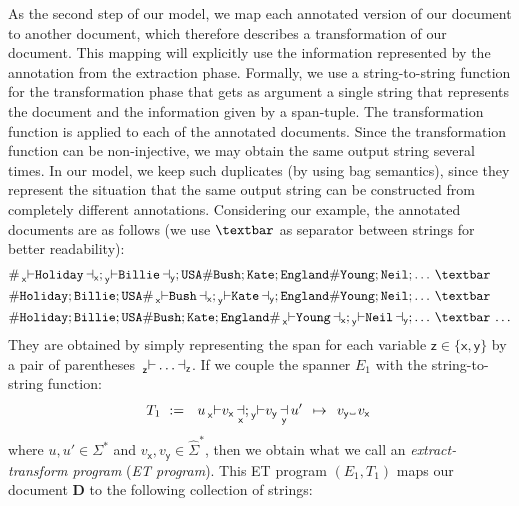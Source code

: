 \documentclass[
a4paper
]{article}
\theoremstyle{plain}
\theoremstyle{definition}
\theoremstyle{remark}
\newcommand{\firstExampleEx}{E_1}
\newcommand{\firstExampleTrans}{T_1}
\newcommand\Vtextvisiblespace[1][.3em]{%
	\mbox{\kern.06em\vrule height.3ex}%
	\vbox{\hrule width#1}%
	\hbox{\vrule height.3ex}}
\DeclareMathOperator{\openmark}{\vdash}
\DeclareMathOperator{\closemark}{\dashv}
\newcommand{\doc}{\ensuremath{\mathbf{D}}}
\newcommand{\open}[1]{\prescript{}{#1}{\openmark}}
\newcommand{\close}[1]{\closemark_{#1}}
\newcommand{\varsx}{\ensuremath{\textsf{x}}}
\newcommand{\varsy}{\ensuremath{\textsf{y}}}
\newcommand{\varsz}{\ensuremath{\textsf{z}}}
\newcommand*{\set}[1]{\ensuremath{\{ #1 \}}}
\begin{document}
As the second step of our model, we map each annotated version of our document to another document, which therefore describes a transformation of our document. This mapping will explicitly use the information represented by the annotation from the extraction phase. Formally, we use a string-to-string function for the transformation phase that gets as argument a single string that represents the document and the information given by a span-tuple.
The transformation function is applied to each of the annotated documents. Since the transformation function can be non-injective, we may obtain the same output string several times. In our model, we keep such duplicates (by using bag semantics), since they represent the situation that the same output string can be constructed from completely different annotations.
Considering our example, the annotated documents are as follows
(we use $\textbar$ as separator between strings for better readability):
\begin{align*}
&\scalebox{1}{$\# \open{\varsx}\texttt{Holiday}\close{\varsx}; \open{\varsy}\texttt{Billie}\close{\varsy}; \texttt{USA} \# \texttt{Bush}; \texttt{Kate};  \texttt{England} \# \texttt{Young}; \texttt{Neil}; \ldots \hspace{2pt}\textbar$}\\
&\scalebox{1}{$\# \texttt{Holiday}; \texttt{Billie}; \texttt{USA} \# \open{\varsx}\texttt{Bush}\close{\varsx}; \open{\varsy}\texttt{Kate}\close{\varsy}; \texttt{England} \# \texttt{Young}; \texttt{Neil}; \ldots \hspace{2pt}\textbar$}\\
&\scalebox{1}{$\# \texttt{Holiday}; \texttt{Billie}; \texttt{USA} \# \texttt{Bush}; \texttt{Kate}; \texttt{England} \# \open{\varsx} \texttt{Young} \close{\varsx}; \open{\varsy} \texttt{Neil} \close{\varsy}; \ldots \hspace{2pt}\textbar \hspace{2pt} \ldots$}
\end{align*}
They are obtained by simply representing the span for 
each variable $\varsz\in\set{\varsx,\varsy}$ by a pair of parentheses~$\open{\varsz} \ldots \close{\varsz}$.
If we couple the spanner $\firstExampleEx$ with the string-to-string function:\label{T1Function}
\[
\firstExampleTrans \ := \ \ u \open{\varsx} v_{\varsx} \close{\varsx}; \open{\varsy} v_{\varsy} \close{\varsy} u' \:\: \mapsto \:\: v_{\varsy} \Vtextvisiblespace \, v_{\varsx}\,
\]
where $u, u' \in \Sigma^*$ and $v_{\varsx}, v_{\varsy} \in \widehat{\Sigma}^*$,
then we obtain what we call an \emph{extract-transform program} (\emph{ET program}). This ET program $(\firstExampleEx,\firstExampleTrans)$ maps our document $\doc$ to the following collection of strings:
\end{document}
